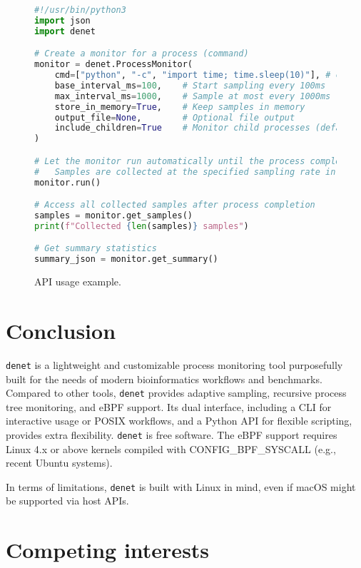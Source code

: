 \documentclass[10pt]{article}
\begin{document}
\begin{figure}[H]
\begin{lstlisting}[frame=single,language=python]
#!/usr/bin/python3
import json
import denet

# Create a monitor for a process (command)
monitor = denet.ProcessMonitor(
    cmd=["python", "-c", "import time; time.sleep(10)"], # command
    base_interval_ms=100,    # Start sampling every 100ms
    max_interval_ms=1000,    # Sample at most every 1000ms
    store_in_memory=True,    # Keep samples in memory
    output_file=None,        # Optional file output
    include_children=True    # Monitor child processes (default True)
)

# Let the monitor run automatically until the process completes.
#   Samples are collected at the specified sampling rate in the background
monitor.run()

# Access all collected samples after process completion
samples = monitor.get_samples()
print(f"Collected {len(samples)} samples")

# Get summary statistics
summary_json = monitor.get_summary()
\end{lstlisting}

\caption{API usage example. \label{fig:api}}
\end{figure}

\section*{Conclusion}

\texttt{denet} is a lightweight and customizable process monitoring tool purposefully built for the needs of modern bioinformatics workflows and benchmarks. Compared to other tools, \texttt{denet} provides adaptive sampling, recursive process tree monitoring, and eBPF support.  Its dual interface, including a CLI for interactive usage or POSIX workflows, and a Python API for flexible scripting, provides extra flexibility. \texttt{denet} is free software. The eBPF support requires Linux 4.x or above kernels compiled with CONFIG\_BPF\_SYSCALL (e.g., recent Ubuntu systems).

In terms of limitations, \texttt{denet} is built with Linux in mind, even if macOS might be supported via host APIs.

\section*{Competing interests}
\end{document}
